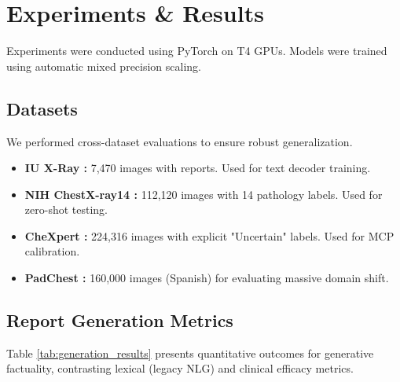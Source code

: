 \documentclass[10pt,a4paper,twocolumn]{article}
\begin{document}
\section{Experiments \& Results}
\label{sec:results}

Experiments were conducted using PyTorch on T4 GPUs. Models were trained using automatic mixed precision scaling.

\subsection{Datasets}
We performed cross-dataset evaluations to ensure robust generalization. 
\begin{itemize}
    \item \textbf{IU X-Ray \cite{chen2020r2gen}:} 7,470 images with reports. Used for text decoder training.
    \item \textbf{NIH ChestX-ray14 \cite{wang2017chestxray14}:} 112,120 images with 14 pathology labels. Used for zero-shot testing.
    \item \textbf{CheXpert \cite{irvin2019chexpert}:} 224,316 images with explicit "Uncertain" labels. Used for MCP calibration.
    \item \textbf{PadChest \cite{bustos2020padchest}:} 160,000 images (Spanish) for evaluating massive domain shift.
\end{itemize}

\subsection{Report Generation Metrics}
Table \ref{tab:generation_results} presents quantitative outcomes for generative factuality, contrasting lexical (legacy NLG) and clinical efficacy metrics.

\begin{table}[h]
\centering
\caption{Report Generation Metrics on IU X-Ray Test Split (n=485 studies)}
\label{tab:generation_results}
\end{table}
\end{document}
